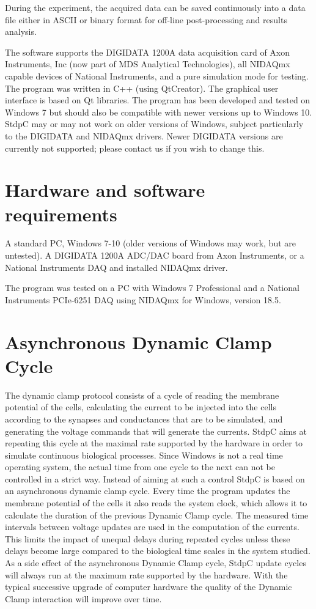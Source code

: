 \documentclass{article}
\begin{document}
During the experiment, the acquired data can be saved continuously into a
data file either in ASCII or binary format for off-line post-processing and
results analysis.
 
The software supports the DIGIDATA 1200A data acquisition card of Axon
Instruments, Inc (now part of MDS Analytical Technologies), all
NIDAQmx capable devices of National Instruments, and a pure simulation
mode for testing. The program was written in C++ (using
QtCreator). The graphical user interface is based on Qt
libraries. The program has been developed and tested on Windows 7 but should also
be compatible with newer versions up to Windows 10. StdpC may or may not work on
older versions of Windows, subject particularly to the DIGIDATA and NIDAQmx drivers.
Newer DIGIDATA versions are currently not supported; please contact us if you
wish to change this.

\section{Hardware and software requirements} 
 
A standard PC, Windows 7-10 (older versions of Windows may work, but are untested).
A DIGIDATA 1200A ADC/DAC board from Axon
Instruments, or a National Instruments DAQ and installed NIDAQmx
driver.

The program was tested on a PC with Windows 7 Professional and a
National Instruments PCIe-6251 DAQ using NIDAQmx for
Windows, version 18.5.

\section{Asynchronous Dynamic Clamp Cycle}
 
The dynamic clamp protocol consists of a cycle of reading the membrane
potential of the cells, calculating the current to be injected into
the cells according to the synapses and conductances that are to be
simulated, and generating the voltage commands that will generate the
currents. StdpC aims at repeating this cycle at the maximal rate
supported by the hardware in order to simulate continuous biological
processes. Since Windows is not a real time operating system, the
actual time from one cycle to the next can not be controlled in a
strict way. Instead of aiming at such a control StdpC is based on an
asynchronous dynamic clamp cycle.  Every time the program updates the
membrane potential of the cells it also reads the system clock,
which allows it to calculate the duration of the previous
Dynamic Clamp cycle. The measured time intervals between voltage
updates are used in the computation of the currents. This limits the
impact of unequal delays during repeated cycles unless these delays
become large compared to the biological time scales in the system
studied. As a side effect of the asynchronous Dynamic Clamp cycle,
StdpC update cycles will always run at the maximum rate supported by
the hardware. With the typical successive upgrade of computer hardware
the quality of the Dynamic Clamp interaction will improve over time.
\end{document}
